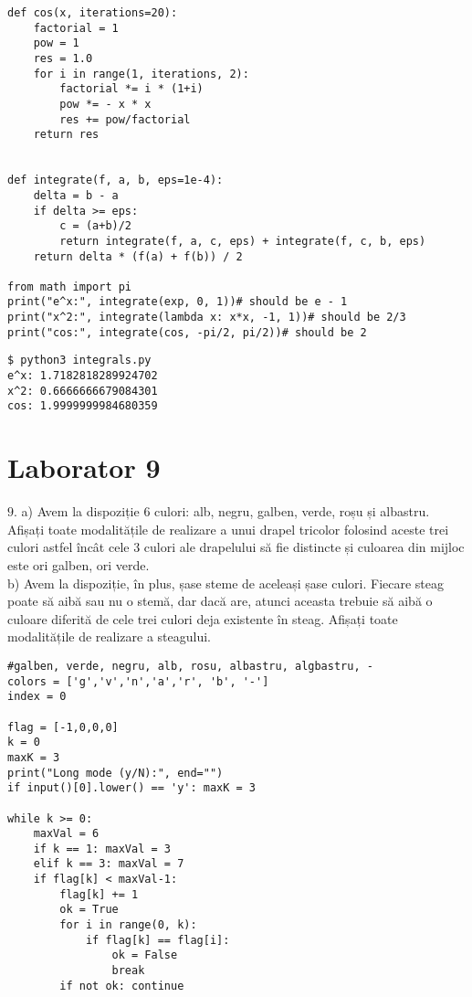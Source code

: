 \documentclass[11pt]{article}
\begin{document}
\begin{itemize}
\begin{itemize}
\begin{verbatim}
def cos(x, iterations=20):
    factorial = 1
    pow = 1
    res = 1.0
    for i in range(1, iterations, 2):
        factorial *= i * (1+i)
        pow *= - x * x
        res += pow/factorial
    return res


def integrate(f, a, b, eps=1e-4):
    delta = b - a
    if delta >= eps: 
        c = (a+b)/2
        return integrate(f, a, c, eps) + integrate(f, c, b, eps)
    return delta * (f(a) + f(b)) / 2

from math import pi
print("e^x:", integrate(exp, 0, 1))# should be e - 1
print("x^2:", integrate(lambda x: x*x, -1, 1))# should be 2/3
print("cos:", integrate(cos, -pi/2, pi/2))# should be 2
\end{verbatim}

\begin{verbatim}
$ python3 integrals.py
e^x: 1.7182818289924702
x^2: 0.6666666679084301
cos: 1.9999999984680359

\end{verbatim}


\pagebreak

\section*{Laborator 9}
\label{sec:orge21007d}

\(9\). a) Avem la dispoziție 6 culori: alb, negru, galben, verde, roșu și albastru. Afișați toate modalitățile de realizare a unui drapel tricolor folosind aceste trei culori astfel încât cele 3 culori ale drapelului să fie distincte și culoarea din mijloc este ori galben, ori verde.\\
b) Avem la dispoziție, în plus, șase steme de aceleași șase culori. Fiecare steag poate să aibă sau nu o stemă, dar dacă are, atunci aceasta trebuie să aibă o culoare diferită de cele trei culori deja existente în steag. Afișați toate modalitățile de realizare a steagului.

\begin{verbatim}
#galben, verde, negru, alb, rosu, albastru, algbastru, -
colors = ['g','v','n','a','r', 'b', '-']
index = 0

flag = [-1,0,0,0]
k = 0
maxK = 3
print("Long mode (y/N):", end="")
if input()[0].lower() == 'y': maxK = 3

while k >= 0:
    maxVal = 6
    if k == 1: maxVal = 3
    elif k == 3: maxVal = 7
    if flag[k] < maxVal-1:
        flag[k] += 1
        ok = True
        for i in range(0, k):
            if flag[k] == flag[i]: 
                ok = False
                break
        if not ok: continue


\end{verbatim}
\end{itemize}
\end{itemize}
\end{document}
